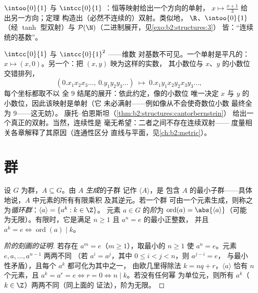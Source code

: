 \begin{example}\label{ex:b2:structures:cbexample}
$\intoo{0}{1}$ 与 $\intcc{0}{1}$ ：恒等映射给出一个方向的单射，
$x \mapsto \frac{x + 1}{3}$ 给出另一方向；定理
构造出（必然不连续的）双射。类似地，
$\R$、$\intoo{0}{1}$（经 $\tanh$ 型双射）与
$\mathcal{P}(\N)$（二进制展开，见\cref{exo:b2:structures:3}）
皆：“连续统的基数”。
\end{example}

\begin{example}[线段与正方形]\label{ex:b2:structures:squareseg}
$\intcc{0}{1}$ 与 $\intcc{0}{1}^2$ ——维数
对基数不可见。一个单射是平凡的：$x
\mapsto (x, 0)$。另一个：把 $(x, y)$ 映为这样的实数，
其小数位与 $x$、$y$ 的小数位交错排列，
\[
(0.x_1x_2x_3\dots,\ 0.y_1y_2y_3\dots)
\;\longmapsto\; 0.x_1y_1x_2y_2x_3y_3\dots,
\]
每个坐标都取不以
全 $9$ 结尾的展开：依此约定，像的小数位
唯一决定 $x$ 与 $y$ 的小数位，因此该映射是单射（它
未必满射——例如像从不会使奇数位小数
最终全为 $9$——这无妨）。
康托–伯恩斯坦（\cref{thm:b2:structures:cantorbernstein}）
给出一个真正的双射。当然，连续性是
毫无希望：二者之间不存在连续双射——
度量相关各章解释了其原因（连通性区分
直线与平面，见\cref{ch:b2:metric}）。
\end{example}

\section{群}

\begin{definition}[生成子群；阶]\label{def:b2:structures:generated}
设 $G$ 为群，$A \subseteq G$。由 $A$ \emph{生成}的子群
记作 $\langle A \rangle$，是
包含 $A$ 的最小子群——具体地说，$A$ 中元素的所有有限乘积
及其逆元。若一个群
可由一个元素生成，则称之为\emph{循环群}：$\langle a\rangle = \{a^k : k \in \Z\}$。
元素 $a \in G$ 的\emph{阶}为
$\operatorname{ord}(a) = \abs{\langle a \rangle}$（可能
为无限）。有限时，它是满足 $n \geq 1$ 且 $a^n = e$ 的最小正整数，
并且 $a^k = e \iff \operatorname{ord}(a) \mid k$。
\end{definition}

\begin{proof}[阶的刻画的证明]
若存在 $a^m = e$（$m \geq 1$），取最小的 $n \geq 1$ 使 $a^n
= e$。元素 $e, a, \dots, a^{n-1}$ 两两不同
（若 $a^{i} = a^{j}$，其中 $0 \leq i < j < n$，则 $a^{j-i} = e$，
与最小性矛盾），且每个 $a^k$ 都可化为其中之一，
由欧几里得除法 $k = nq + r$，$\langle a\rangle$ 恰有 $n$
个元素，且 $a^k = a^r = e \iff r = 0 \iff n \mid k$。若没有任何幂
为单位元，则所有 $a^k$（$k \in \Z$）两两不同（同上面的
证法），阶为无限。
\end{proof}


